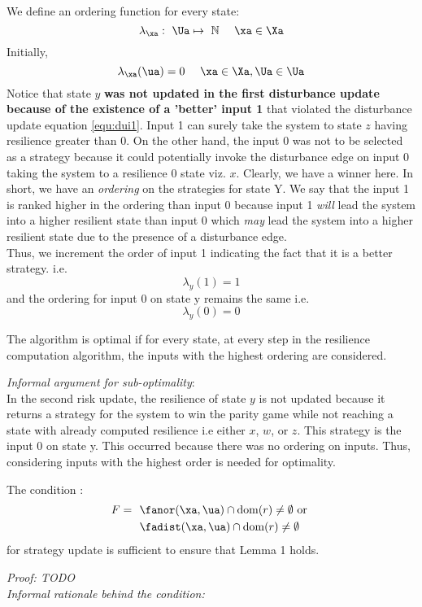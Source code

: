 \begin{itemize}
We define an ordering function for every state:
\[
\lambda_{\xa}:\ \Ua \mapsto \  \mathbb{N}   \ \ \ \ \xa \in \Xa
\]
Initially,
\[
\lambda_{\xa}(\ua) = 0   \ \ \ \ \xa \in \Xa, \Ua \in \Ua
\]
Notice that state $y$ \textbf{was not updated in the first disturbance update because of the existence of a 'better' input 1} that violated the disturbance update equation \ref{equ:dui1}. Input 1 can surely take the system to state $z$ having resilience greater than 0. On the other hand, the input 0 was not to be selected as a strategy because it could potentially invoke the disturbance edge on input 0 taking the system to a resilience 0 state viz. $x$. Clearly, we have a winner here. In short, we have an \emph{ordering} on the strategies for state Y. We say that the input 1 is ranked higher in the ordering than input 0 because input 1 \emph{will} lead the system into a higher resilient state than input 0 which \emph{may} lead the system into a higher resilient state due to the presence of a disturbance edge.   \\

Thus, we increment the order of input 1 indicating the fact that it is a better strategy.
i.e.
\[
\lambda_{y}(1) = 1
\]
and the ordering for input 0 on state y remains the same i.e.
\[
\lambda_{y}(0) = 0
\]

\begin{lemma}
The algorithm is optimal if for every state, at every step in the resilience computation algorithm, the inputs with the highest ordering are considered.
\end{lemma}
\emph{Informal argument for sub-optimality}:\\
In the second risk update, the resilience of state $y$ is not updated because it returns a strategy for the system to win the parity game while not reaching a state with already computed resilience i.e either $x$, $w$, or $z$. This strategy is the input 0 on state y. This occurred because there was no ordering on inputs. Thus, considering inputs with the highest order is needed for optimality.

\begin{lemma}
The condition :
\begin{align*}
F =\ \  
&\fanor(\xa, \ua) \cap \mathrm{dom}(r) \neq \emptyset \text {   or } \\ 
&\fadist(\xa, \ua) \cap \mathrm{dom}(r) \neq \emptyset
\end{align*}
for strategy update is sufficient to ensure that Lemma 1 holds.
\end{lemma}
\emph{Proof: TODO}\\
\emph{Informal rationale behind the condition: }\\


\end{itemize}
